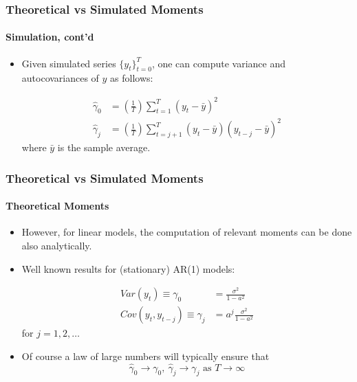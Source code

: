 \documentclass{beamer}
\begin{document}
\begin{frame}
\frametitle{Theoretical vs Simulated Moments}
\framesubtitle{Simulation, cont'd}
\small 
\begin{itemize}
	\item Given simulated series $ \{y_{t} \}_{t=0}^{T} $, one can compute variance and autocovariances of $ y $ as follows:
	
	\begin{align*}
	\hat{\gamma}_{0} &= \left(\frac{1}{T} \right)\sum_{t=1}^{T}(y_{t}-\bar{y})^{2} \\
	\hat{\gamma}_{j} &= \left(\frac{1}{T} \right)\sum_{t=j+1}^{T}(y_{t}-\bar{y})(y_{t-j}-\bar{y})^{2}
	\end{align*}
	where $ \bar{y} $ is the sample average.
	
\end{itemize}
\end{frame}

\begin{frame}
\frametitle{Theoretical vs Simulated Moments}
\framesubtitle{Theoretical Moments}
\small 
\begin{itemize}
	\item However, for linear models, the computation of relevant moments can be done also analytically.
	\item Well known results for (stationary) AR(1) models:
	
	\begin{align*}
	Var(y_{t}) \equiv \gamma_{0} &= \frac{\sigma^{2}}{1-a^{2}} \\
	Cov(y_{t},y_{t-j}) \equiv \gamma_{j} &= a^{j}\frac{\sigma^{2}}{1-a^{2}}
	\end{align*}
	for $ j=1,2,\dots $
	
	\item Of course a law of large numbers will typically ensure that
	$$ \hat{\gamma}_{0} \rightarrow \gamma_{0}, \ \hat{\gamma}_{j} \rightarrow \gamma_{j} \text{ as } T \rightarrow \infty$$
\end{itemize}
\end{frame}
\end{document}
